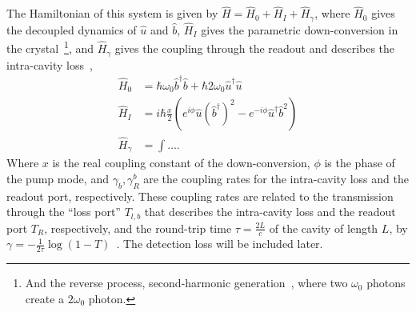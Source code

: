 The Hamiltonian of this system is given by $\hat H = \hat H_0 + \hat H_I + \hat H_\gamma$, where $\hat H_0$ gives the decoupled dynamics of $\hat u$ and $\hat b$, $\hat H_I$ gives the parametric down-conversion in the crystal~\footnote{And the reverse process, second-harmonic generation~\cite{}, where two $\omega_0$ photons create a $2\omega_0$ photon.}, and $\hat H_\gamma$ gives the coupling through the readout and describes the intra-cavity loss~\cite{}, 
\begin{align}
\hat H_0 &= \hbar \omega_0 \hat b^\dag \hat b + \hbar 2 \omega_0 \hat u^\dag \hat u\\
\hat H_I &= i \hbar \frac{x}{2} (e^{i\phi} \hat u (\hat b^\dag)^2 - e^{-i\phi} \hat u^\dag \hat b^2)\\
\hat H_\gamma &= \int \ldots .
\end{align}
Where $x$ is the real coupling constant of the down-conversion, $\phi$ is the phase of the pump mode, and $\gamma_b, \gamma^b_R$ are the coupling rates for the intra-cavity loss and the readout port, respectively. These coupling rates are related to the transmission through the ``loss port'' $T_{l,b}$ that describes the intra-cavity loss and the readout port $T_R$, respectively, and the round-trip time $\tau = \frac{2L}{c}$ of the cavity of length $L$, by $\gamma = -\frac{1}{2\tau}\log(1-T)$~\cite{}. The detection loss will be included later.

